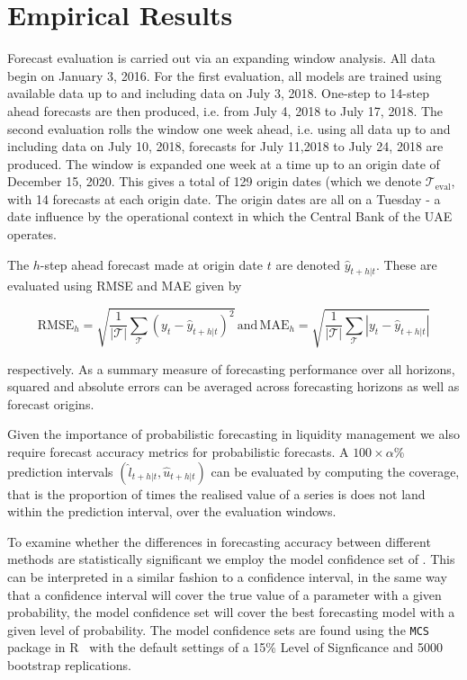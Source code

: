 \section{Empirical Results}
\label{sec:results}

Forecast evaluation is carried out via an expanding window analysis. All data begin on January 3, 2016. For the first evaluation, all models are trained using available data up to and including data on July 3, 2018. One-step to 14-step ahead forecasts are then produced, i.e. from July 4, 2018 to July 17, 2018. The second evaluation rolls the window one week ahead, i.e. using all data up to and including data on July 10, 2018, forecasts for July 11,2018 to July 24, 2018 are produced. The window is expanded one week at a time up to an origin date of December 15, 2020. This gives a total of 129 origin dates (which we denote $\mathcal{T}_{\textrm{eval}}$, with 14 forecasts at each origin date. The origin dates are all on a Tuesday - a date influence by the operational context in which the Central Bank of the UAE operates.

The $h$-step ahead forecast made at origin date $t$ are denoted $\hat{y}_{t+h|t}$. These are evaluated using RMSE and MAE given by

\[
\textrm{RMSE}_h=\sqrt{\frac{1}{|\mathcal{T}|}\sum_\mathcal{T}(y_t-\hat{y}_{t+h|t})^2}\,\textrm{and}\,\textrm{MAE}_h=\sqrt{\frac{1}{|\mathcal{T}|}\sum_\mathcal{T}|y_t-\hat{y}_{t+h|t}|}
\]

respectively. As a summary measure of forecasting performance over all horizons, squared and absolute errors can be averaged across forecasting horizons as well as forecast origins.

Given the importance of probabilistic forecasting in liquidity management we also require forecast accuracy metrics for probabilistic forecasts. A $100\times\alpha$\% prediction intervals $(\hat{l}_{t+h|t},\hat{u}_{t+h|t})$ can be evaluated by computing the coverage, that is the proportion of times the realised value of a series is does not land within the prediction interval, over the evaluation windows. 

To examine whether the differences in forecasting accuracy between different methods are statistically significant we employ the model confidence set of \citet{HanEtAl2011}. This can be interpreted in a similar fashion to a confidence interval, in the same way that a confidence interval will cover the true value of a parameter with a given probability, the model confidence set will cover the best forecasting model with a given level of probability. The model confidence sets are found using the \texttt{MCS} package in R~\citep{MCSpac} with the default settings of a 15\% Level of Signficance and 5000 bootstrap replications.

